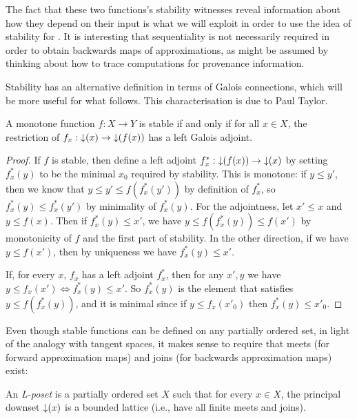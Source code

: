 The fact that these two functions's stability witnesses reveal information about how they depend on their input is what we will exploit in order to use the idea of stability for \GPS. It is interesting that sequentiality is not necessarily required in order to obtain backwards maps of approximations, as might be assumed by thinking about how to trace computations for provenance information.

Stability has an alternative definition in terms of Galois connections, which will be more useful for what follows. This characterisation is due to Paul Taylor.

\begin{lemma}
  A monotone function $f : X \to Y$ is stable if and only if for all
  $x \in X$, the restriction of $f_x : \mathop{\downarrow}(x) \to \mathop{\downarrow}(f(x))$
  has a left Galois adjoint.
\end{lemma}

\begin{proof}
  If $f$ is stable, then define a left adjoint
  $f^*_x : \mathop{\downarrow}(f(x)) \to \mathop{\downarrow}(x)$ by setting $f^*_x(y)$ to be
  the minimal $x_0$ required by stability. This is monotone: if
  $y \leq y'$, then we know that $y \leq y' \leq f(f^*_x(y'))$ by
  definition of $f^*_x$, so $f^*_x(y) \leq f^*_x(y')$ by minimality of
  $f^*_x(y)$. For the adjointness, let $x' \leq x$ and $y \leq
  f(x)$. Then if $f^*_x(y) \leq x'$, we have
  $y \leq f(f^*_x(y)) \leq f(x')$ by monotonicity of $f$ and the first
  part of stability. In the other direction, if we have
  $y \leq f(x')$, then by uniqueness we have $f^*_x(y) \leq x'$.

  If, for every $x$, $f_x$ has a left adjoint $f^*_x$, then for any
  $x', y$ we have $y \leq f_x(x') \Leftrightarrow f^*_x(y) \leq
  x'$. So $f^*_x(y)$ is the element that satisfies
  $y \leq f(f^*_x(y))$, and it is minimal since if $y \leq f_x(x'_0)$
  then $f^*_x(y) \leq x'_0$.
\end{proof}

Even though stable functions can be defined on any partially ordered set, in light of the analogy with tangent spaces, it makes sense to require that meets (for forward approximation maps) and joins (for backwards approximation maps) exist:

\begin{definition}
  An \emph{L-poset} is a partially ordered set $X$ such that for every $x \in X$, the principal downset $\mathop{\downarrow}(x)$ is a bounded lattice (i.e., have all finite meets and joins).
\end{definition}

